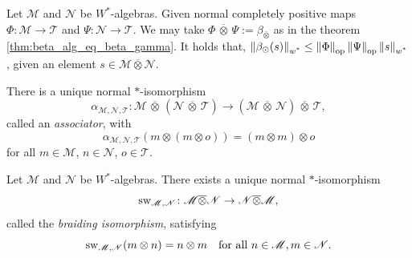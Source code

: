 \begin{proposition} \cite[Proof 115 III] {westerbaanCategoryNeumannAlgebras2019} \label{prop:norm_beta_alg}
  Let  $\mathscr{M}$ and $\mathscr{N}$ be $W^*$-algebras.
  Given normal completely positive maps $\Phi:\mathscr{M} \to \mathscr{T}$ and $\Psi:\mathscr{N} \to \mathscr{T}$. We may take $\Phi\, \overline{\otimes} \,\Psi:= \beta_{\bar{\otimes}}$ as in the theorem \autoref{thm:beta_alg_eq_beta_gamma}. It holds that, $\left\lVert \beta_\odot(s) \right\rVert_{\text{$w^*$}} \leq \left\lVert \Phi \right\rVert_{\text{op}}\left\lVert \Psi \right\rVert_{\text{op}}\left\lVert s \right\rVert_{\text{$w^*$}}$, given an element $s\in \mathscr{M} \overline{\otimes} \mathscr{N}$.
\end{proposition}

\begin{proposition} \cite[Corollary 119 IV]{westerbaanCategoryNeumannAlgebras2019} 
  \label{prop:assoc_nmiu}
   There is a unique normal $\ast$-isomorphism
\[
\alpha_{\mathscr{M},\mathscr{N},\mathscr{T}} : \mathscr{M}\, \overline{\otimes} \, (\mathscr{N} \,\overline{\otimes} \,\mathscr{T}) \longrightarrow (\mathscr{M} \, \overline{\otimes} \, \mathscr{N} ) \, \overline{\otimes} \, \mathscr{T},
\]
called an \emph{associator}, with
\[
\alpha_{\mathscr{M},\mathscr{N},\mathscr{T}}(m \otimes (m \otimes o)) = (m \otimes m) \otimes o
\]
for all \( m \in \mathscr{M} \), \( n \in \mathscr{N} \), \( o \in \mathscr{T} \).
\end{proposition}


\begin{proposition} \cite[Exercise 119 IVc]{westerbaanCategoryNeumannAlgebras2019} \label{prop:swap_nmiu}
  Let $\mathscr{M}$ and $\mathscr{N}$ be $W^*$-algebras.
There exists a unique normal $\ast$-isomorphism
\[
    \mathrm{sw}_{\mathscr{M},\mathscr{N}} \colon \mathscr{M} \overline{\otimes} \mathscr{N} \to \mathscr{N} \overline{\otimes} \mathscr{M},
    \]
    called the \emph{braiding isomorphism}, satisfying
    \[
    \mathrm{sw}_{\mathscr{M},\mathscr{N}}(m \otimes n) = n \otimes m \quad \text{for all } n \in \mathscr{M}, m \in \mathscr{N}.
    \]
\end{proposition}


